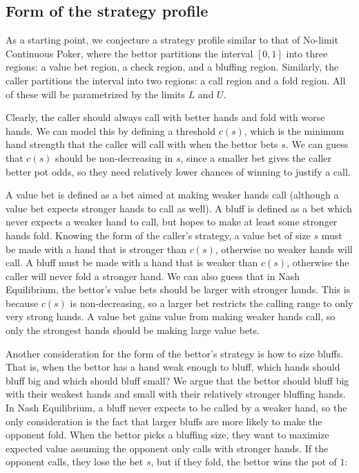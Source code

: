 \documentclass[a4paper,12pt]{article}
\begin{document}
\subsection{Form of the strategy profile}


As a starting point, we conjecture a strategy profile similar to that of No-limit Continuous Poker, where the bettor partitions the interval $[0, 1]$ into three regions: a value bet region, a check region, and a bluffing region. Similarly, the caller partitions the interval into two regions: a call region and a fold region. All of these will be parametrized by the limits $L$ and $U$. 

Clearly, the caller should always call with better hands and fold with worse hands.  We can model this by defining a threshold $c(s)$, which is the minimum hand strength that the caller will call with when the bettor bets $s$. We can guess that $c(s)$ should be non-decreasing in $s$, since a smaller bet gives the caller better pot odds, so they need relatively lower chances of winning to justify a call.

A value bet is defined as a bet aimed at making weaker hands call (although a value bet expects stronger hands to call as well). A bluff is defined as a bet which never expects a weaker hand to call, but hopes to make at least some stronger hands fold. Knowing the form of the caller's strategy, a value bet of size $s$ must be made with a hand that is stronger than $c(s)$, otherwise no weaker hands will call. A bluff must be made with a hand that is weaker than $c(s)$, otherwise the caller will never fold a stronger hand. We can also guess that in Nash Equilibrium, the bettor's value bets should be larger with stronger hands. This is because $c(s)$ is non-decreasing, so a larger bet restricts the calling range to only very strong hands. A value bet gains value from making weaker hands call, so only the strongest hands should be making large value bets. 

Another consideration for the form of the bettor's strategy is how to size bluffs. That is, when the bettor has a hand weak enough to bluff, which hands should bluff big and which should bluff small? We argue that the bettor should bluff big with their weakest hands and small with their relatively stronger bluffing hands. In Nash Equilibrium, a bluff never expects to be called by a weaker hand, so the only consideration is the fact that larger bluffs are more likely to make the opponent fold. When the bettor picks a bluffing size, they want to maximize expected value assuming the opponent only calls with stronger hands. If the opponent calls, they lose the bet $s$, but if they fold, the bettor wins the pot of $1$:
\end{document}
